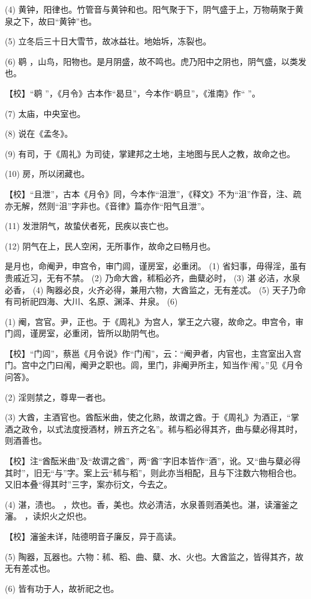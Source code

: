 \documentclass[12pt,UTF8]{ctexbook}
\begin{document}
(4) 黄钟，阳律也。竹管音与黄钟和也。阳气聚于下，阴气盛于上，万物萌聚于黄泉之下，故曰“黄钟”也。

(5) 立冬后三十日大雪节，故冰益壮。地始坼，冻裂也。

(6) 鹖 ，山鸟，阳物也。是月阴盛，故不鸣也。虎乃阳中之阴也，阴气盛，以类发也。

【校】“鹖 ”，《月令》古本作“曷旦”，今本作“鹖旦”，《淮南》作“ ”。

(7) 太庙，中央室也。

(8) 说在《孟冬》。

(9) 有司，于《周礼》为司徒，掌建邦之土地，主地图与民人之教，故命之也。

(10) 房，所以闭藏也。

【校】“且泄”，古本《月令》同，今本作“沮泄”，《释文》不为“沮”作音，注、疏亦无解，然则“沮”字非也。《音律》篇亦作“阳气且泄”。

(11) 发泄阴气，故蛰伏者死，民疾以丧亡也。

(12) 阴气在上，民人空闲，无所事作，故命之曰畅月也。

是月也，命阉尹，申宫令，审门闾，谨房室，必重闭。 (1) 省妇事，毋得淫，虽有贵戚近习，无有不禁。 (2) 乃命大酋，秫稻必齐，曲糵必时， (3) 湛 必洁，水泉必香， (4) 陶器必良，火齐必得，兼用六物，大酋监之，无有差忒。 (5) 天子乃命有司祈祀四海、大川、名原、渊泽、井泉。 (6)

(1) 阉，宫官。尹，正也。于《周礼》为宫人，掌王之六寝，故命之。申宫令，审门闾，谨房室，必重闭，皆所以助阴气也。

【校】“门闾”，蔡邕《月令说》作“门闱”，云：“阉尹者，内官也，主宫室出入宫门。宫中之门曰闱，阉尹之职也。闾，里门，非阉尹所主，知当作‘闱’。”见《月令问答》。

(2) 淫则禁之，尊卑一者也。

(3) 大酋，主酒官也。酋酝米曲，使之化熟，故谓之酋。于《周礼》为酒正，“掌酒之政令，以式法度授酒材，辨五齐之名”。秫与稻必得其齐，曲与糵必得其时，则酒善也。

【校】注“酋酝米曲”及“故谓之酋”，两“酋”字旧本皆作“酒”，讹。又“曲与糵必得其时”，旧无“与”字。案上云“秫与稻”，则此亦当相配，且与下注数六物相合也。又旧本叠“得其时”三字，案亦衍文，今去之。

(4) 湛，渍也。 ，炊也。香，美也。炊必清洁，水泉善则酒美也。湛，读瀋釜之瀋。 ，读炽火之炽也。

【校】瀋釜未详，陆德明音子廉反，异于高读。

(5) 陶器，瓦器也。六物：秫、稻、曲、糵、水、火也。大酋监之，皆得其齐，故无有差忒也。

(6) 皆有功于人，故祈祀之也。
\end{document}
